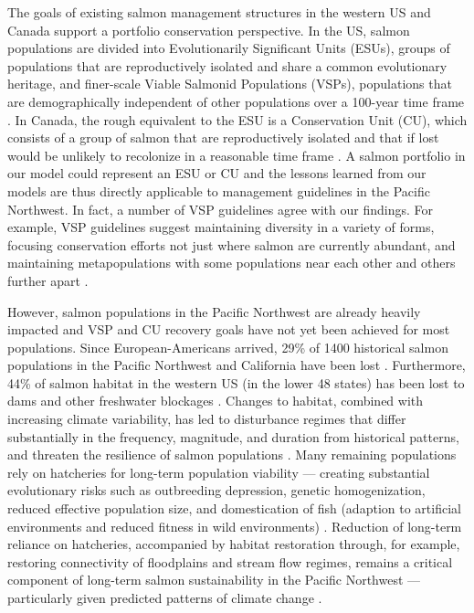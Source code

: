 \documentclass[12pt,english]{article}
\begin{document}
\begin{spacing}{1.3}
The goals of existing salmon management structures in the western US and Canada support a portfolio conservation perspective. In the US, salmon populations are divided into Evolutionarily Significant Units (ESUs), groups of populations that are reproductively isolated and share a common evolutionary heritage, and finer-scale Viable Salmonid Populations (VSPs), populations that are demographically independent of other populations over a 100-year time frame \citep{mcelhany2000}. In Canada, the rough equivalent to the ESU is a Conservation Unit (CU), which consists of a group of salmon that are reproductively isolated and that if lost would be unlikely to recolonize in a reasonable time frame \citep{dfo2005wsp}. A salmon portfolio in our model could represent an ESU or CU and the lessons learned from our models are thus directly applicable to management guidelines in the Pacific Northwest. In fact, a number of VSP guidelines agree with our findings. For example, VSP guidelines suggest maintaining diversity in a variety of forms, focusing conservation efforts not just where salmon are currently abundant, and maintaining metapopulations with some populations near each other and others further apart \citep{mcelhany2000}.

However, salmon populations in the Pacific Northwest are already heavily impacted \citep[e.g.][]{gustafson2007} and VSP and CU recovery goals have not yet been achieved for most populations. Since European-Americans arrived, 29\% of 1400 historical salmon populations in the Pacific Northwest and California have been lost \citep{gustafson2007}. Furthermore, 44\% of salmon habitat in the western US (in the lower 48 states) has been lost to dams and other freshwater blockages \citep{mcclure2008a}. Changes to habitat, combined with increasing climate variability, has led to disturbance regimes that differ substantially in the frequency, magnitude, and duration from historical patterns, and threaten the resilience of salmon populations \citep{waples2009}. Many remaining populations rely on hatcheries for long-term population viability --- creating substantial evolutionary risks such as outbreeding depression, genetic homogenization, reduced effective population size, and domestication of fish (adaption to artificial environments and reduced fitness in wild environments) \citep{mcclure2008b}. Reduction of long-term reliance on hatcheries, accompanied by habitat restoration through, for example, restoring connectivity of floodplains and stream flow regimes, remains a critical component of long-term salmon sustainability in the Pacific Northwest --- particularly given predicted patterns of climate change \citep{beechie2013}.


\end{spacing}
\end{document}
